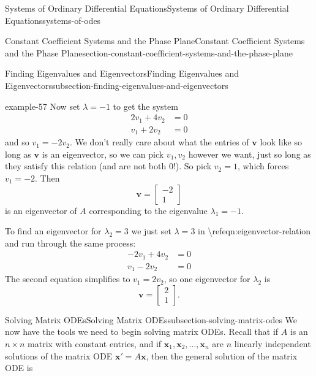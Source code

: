 \documentclass[oneside,10pt,]{book}
\numberwithin{equation}{section}
\renewcommand{\vec}[1]{\mathbf{#1}}
\newcommand{\amp}{&}
\begin{document}
\begin{chapterptx}{Systems of Ordinary Differential Equations}{}{Systems of Ordinary Differential Equations}{}{}{systems-of-odes}
\begin{sectionptx}{Constant Coefficient Systems and the Phase Plane}{}{Constant Coefficient Systems and the Phase Plane}{}{}{section-constant-coefficient-systems-and-the-phase-plane}
\begin{subsectionptx}{Finding Eigenvalues and Eigenvectors}{}{Finding Eigenvalues and Eigenvectors}{}{}{subsection-finding-eigenvalues-and-eigenvectors}
\begin{example}{}{example-57}
\hypertarget{p-341}{}%
Now set \(\lambda = -1\) to get the system%
\begin{align*}
2v_{1} + 4v_{2} \amp = 0\\
v_{1} + 2v_{2} \amp = 0
\end{align*}
and so \(v_{1} = -2v_{2}\). We don't really care about what the entries of \(\vec{v}\) look like so long as \(\vec{v}\) is an eigenvector, so we can pick \(v_{1},v_{2}\) however we want, just so long as they satisfy this relation (and are not both \(0\)!). So pick \(v_{2} = 1\), which forces \(v_{1} = -2\). Then%
\begin{equation*}
\vec{v} = \begin{bmatrix}-2\\1\end{bmatrix}
\end{equation*}
is an eigenvector of \(A\) corresponding to the eigenvalue \(\lambda_{1} = -1\).%
\par
\hypertarget{p-342}{}%
To find an eigenvector for \(\lambda_{2} = 3\) we just set \(\lambda  = 3\) in \textbackslash{}ref\textbraceleft{}eqn:eigenvector-relation\textbraceright{} and run through the same process:%
\begin{align*}
-2v_{1}+4v_{2} \amp = 0\\
v_{1} - 2v_{2} \amp = 0
\end{align*}
The second equation simplifies to \(v_{1} = 2v_{2}\), so one eigenvector for \(\lambda_{2}\) is%
\begin{equation*}
\vec{v} = \begin{bmatrix}2 \\ 1\end{bmatrix}.
\end{equation*}
%
\end{example}
\end{subsectionptx}
%
%
\typeout{************************************************}
\typeout{************************************************}
%
\begin{subsectionptx}{Solving Matrix ODEs}{}{Solving Matrix ODEs}{}{}{subsection-solving-matrix-odes}
\hypertarget{p-343}{}%
We now have the tools we need to begin solving matrix ODEs. Recall that if \(A\) is an \(n\times n\) matrix with constant entries, and if \(\vec{x}_{1},\vec{x}_{2},\ldots,\vec{x}_{n}\) are \(n\) linearly independent solutions of the matrix ODE \(\vec{x}'=A\vec{x}\), then the general solution of the matrix ODE is%
\begin{equation*}

\end{equation*}
\end{subsectionptx}
\end{sectionptx}
\end{chapterptx}
\end{document}
